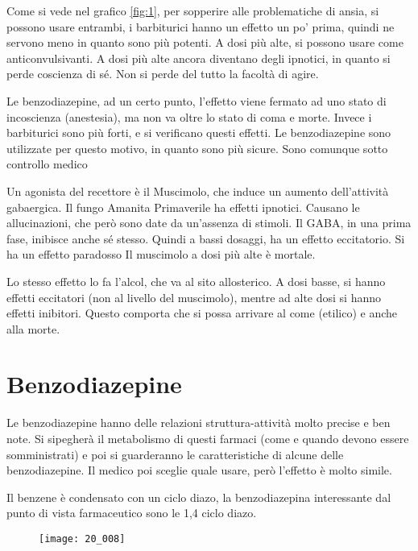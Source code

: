 Come si vede nel grafico \ref{fig:1}, per sopperire alle problematiche di ansia, si possono usare entrambi, i
barbiturici hanno un effetto un po' prima, quindi ne servono meno in
quanto sono più potenti.
A dosi più alte, si possono usare come anticonvulsivanti.
A dosi più alte ancora diventano degli ipnotici, in quanto si perde
coscienza di sé. Non si perde del tutto la facoltà di agire.

Le benzodiazepine, ad un certo punto, l'effetto viene fermato ad uno
stato di incoscienza (anestesia), ma non va oltre lo stato di coma e
morte. Invece i barbiturici sono più forti, e si verificano questi
effetti.
Le benzodiazepine sono utilizzate per questo motivo, in quanto sono più sicure.
Sono comunque sotto controllo medico


Un agonista del recettore è il Muscimolo, che induce un aumento
dell'attività gabaergica. Il fungo Amanita Primaverile ha effetti
ipnotici. Causano le allucinazioni, che però sono date da un'assenza di
stimoli.
Il GABA, in una prima fase, inibisce anche sé stesso. Quindi a bassi
dosaggi, ha un effetto eccitatorio. Si ha un effetto paradosso
Il muscimolo a dosi più alte è mortale.


Lo stesso effetto lo fa l'alcol, che va al sito allosterico. A dosi
basse, si hanno effetti eccitatori (non al livello del muscimolo),
mentre ad alte dosi si hanno effetti inibitori. Questo comporta che si
possa arrivare al come (etilico) e anche alla morte.

\section{Benzodiazepine}

Le benzodiazepine hanno delle relazioni struttura-attività molto precise e ben note. Si sipegherà il metabolismo di
questi farmaci (come e quando devono essere somministrati) e poi si
guarderanno le caratteristiche di alcune delle benzodiazepine. Il medico
poi sceglie quale usare, però l'effetto è molto simile.

Il benzene è condensato con un ciclo diazo, la benzodiazepina
interessante dal punto di vista farmaceutico sono le 1,4 ciclo diazo.

\begin{figure}[H]
    \centering
    \texttt{[image: 20\_008]}
\end{figure}


